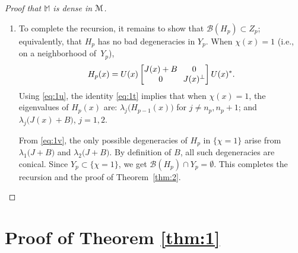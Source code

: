 \documentclass[11pt]{article}
\newcommand{\ie}{i.e.,\xspace}
\numberwithin{equation}{section}
\let\mathcal\mathscr
\let\pazocal\EuScript
\theoremstyle{definition}
\newcommand{\MM}{\pazocal{M}}
\newcommand{\BB}{\mathcal{B}}
\newcommand{\Mm}{\mathbb{M}}
\let\epsi\varepsilon
\newcommand{\matrice}[1]{\arraycolsep3.5pt\begin{bmatrix}#1\end{bmatrix}}
\begin{document}
\begin{proof}[Proof that $\Mm$ is dense in $\MM$]
\begin{enumerate}
The recursion assumption $d(H,H_{p-1}) \leq (1-2^{-p-1}) \epsi$ and $d(H_p,H_{p-1}) \leq 2^{-p} \epsi$ yield $d(H, H_p) \leq \bigl(1-2^{-p}\bigr) \epsi$. Moreover, $d(H_p,H_{p-1}) \leq \eta_0/8$ implies $\| H_p - H_{p-1} \|_{C^2} \leq \eta_0$. From Lemma \ref{lem:1c} and the recursion assumption $\BB(H_{p-1}) \subset Z_{p-1}$, $\BB(H_p) \subset Z_{p-1}$.

\item
To complete the recursion, it remains to show that $\BB(H_p) \subset Z_p$; equivalently, that $H_p$ has no bad degeneracies in $Y_p$. When $\chi(x) = 1$ (\ie on a neighborhood of~$Y_p$),
\begin{equation}\label{eq:1t}
H_p(x) = U(x) \matrice{J(x) + B & 0 \\ 0 & J(x)^\perp}U(x)^*.
\end{equation}
Using \eqref{eq:1u}, the identity \eqref{eq:1t} implies that when $\chi(x)=1$, the eigenvalues of $H_p(x)$ are: $\lambda_j\bigl( H_{p-1}(x) \bigr)$ for $j \neq n_p, n_p+1$; and $\lambda_j\bigl( J(x) + B \bigr)$, $j =1,2$.

From \eqref{eq:1v}, the only possible degeneracies of $H_p$ in $\{ \chi = 1 \}$ arise from $\lambda_1\bigl( J + B \bigr)$ and $\lambda_2\bigl( J + B \bigr)$. By definition of $B$, all such degeneracies are conical. Since $Y_p \subset \{ \chi=1\}$, we get $\BB(H_p) \cap Y_p = \emptyset$. This completes the recursion and the proof of Theorem~\ref{thm:2}.\qedhere
\end{enumerate}
\end{proof}

\section{Proof of Theorem \ref{thm:1}}\label{sec:4}
\end{document}
